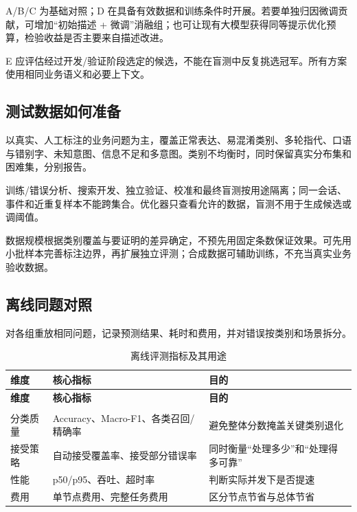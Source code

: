 \documentclass[UTF8,a4paper,11pt,fontset=windows]{ctexart}
\begin{document}
A/B/C 为基础对照；D 在具备有效数据和训练条件时开展。若要单独归因微调贡献，可增加“初始描述 + 微调”消融组；也可让现有大模型获得同等提示优化预算，检验收益是否主要来自描述改进。


E 应评估经过开发/验证阶段选定的候选，不能在盲测中反复挑选冠军。所有方案使用相同业务语义和必要上下文。


\subsection{测试数据如何准备}

以真实、人工标注的业务问题为主，覆盖正常表达、易混淆类别、多轮指代、口语与错别字、未知意图、信息不足和多意图。类别不均衡时，同时保留真实分布集和困难集，分别报告。


训练/错误分析、搜索开发、独立验证、校准和最终盲测按用途隔离；同一会话、事件和近重复样本不能跨集合。优化器只查看允许的数据，盲测不用于生成候选或调阈值。


数据规模根据类别覆盖与要证明的差异确定，不预先用固定条数保证效果。可先用小批样本完善标注边界，再扩展独立评测；合成数据可辅助训练，不充当真实业务验收数据。


\subsection{离线同题对照}

对各组重放相同问题，记录预测结果、耗时和费用，并对错误按类别和场景拆分。


{\small\setlength{\tabcolsep}{4pt}\renewcommand{\arraystretch}{1.28}
\begin{longtable}{>{\raggedright\arraybackslash}p{0.220\dimexpr\linewidth-6\tabcolsep\relax}>{\raggedright\arraybackslash}p{0.380\dimexpr\linewidth-6\tabcolsep\relax}>{\raggedright\arraybackslash}p{0.400\dimexpr\linewidth-6\tabcolsep\relax}}
\caption{离线评测指标及其用途}\label{tab:offline-metrics}\\
\toprule
\textbf{维度} & \textbf{核心指标} & \textbf{目的} \\
\midrule
\endfirsthead
\toprule
\textbf{维度} & \textbf{核心指标} & \textbf{目的} \\
\midrule
\endhead
\midrule\multicolumn{3}{r}{\scriptsize\color{Muted}续下页}\\\endfoot
\bottomrule\endlastfoot
分类质量 & Accuracy、Macro-F1、各类召回/精确率 & 避免整体分数掩盖关键类别退化 \\
接受策略 & 自动接受覆盖率、接受部分错误率 & 同时衡量“处理多少”和“处理得多可靠” \\
性能 & p50/p95、吞吐、超时率 & 判断实际并发下是否提速 \\
费用 & 单节点费用、完整任务费用 & 区分节点节省与总体节省 \\
\end{longtable}}
\end{document}
